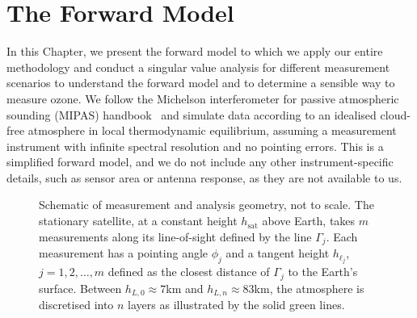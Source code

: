 \chapter{The Forward Model}
\label{ch:formodel}

In this Chapter, we present the forward model to which we apply our entire methodology and conduct a singular value analysis for different measurement scenarios to understand the forward model and to determine a sensible way to measure ozone. We follow the Michelson interferometer for passive atmospheric sounding (MIPAS) handbook~\cite{mipas2000handbook} and simulate data according to an idealised cloud-free atmosphere in local thermodynamic equilibrium, assuming a measurement instrument with infinite spectral resolution and no pointing errors.
This is a simplified forward model, and we do not include any other instrument-specific details, such as sensor area or antenna response, as they are not available to us. 
\begin{figure}[ht!]
	\centering
	
	\caption[Schematic of measurement and analysis geometry.]{Schematic of measurement and analysis geometry, not to scale.
		The stationary satellite, at a constant height $h_\text{sat}$ above Earth, takes $m$ measurements along its line-of-sight defined by the line $\Gamma_j$.
		Each measurement has a pointing angle $\phi_j$ and a tangent height $h_{\ell_j}$, $j=1,2,\dots,m$ defined as the closest distance of $\Gamma_j$ to the Earth's surface.
		Between $h_{L,0} \approx 7$km and $h_{L,n} \approx 83$km, the atmosphere is discretised into $n$ layers as illustrated by the solid green lines.}
	\label{fig:LIMB}
\end{figure}

